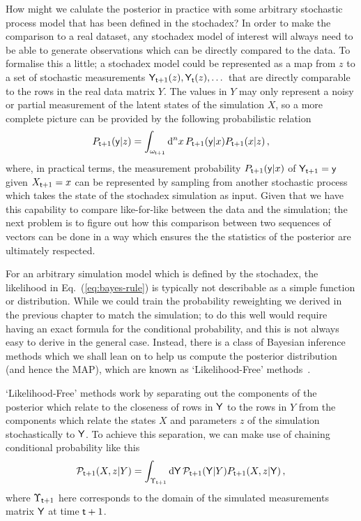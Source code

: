 How might we calulate the posterior in practice with some arbitrary stochastic process model that has been defined in the stochadex? In order to make the comparison to a real dataset, any stochadex model of interest will always need to be able to generate observations which can be directly compared to the data. To formalise this a little; a stochadex model could be represented as a map from $z$ to a set of stochastic measurements ${\sf Y}_{{\sf t}+1}(z), {\sf Y}_{{\sf t}}(z), \dots$ that are directly comparable to the rows in the real data matrix $Y$. The values in $Y$ may only represent a noisy or partial measurement of the latent states of the simulation $X$, so a more complete picture can be provided by the following probabilistic relation
\begin{align}
P_{{\sf t}+1}({\sf y} \vert z) = \int_{\omega_{{\sf t}+1}}{\rm d}^nx\, P_{{\sf t}+1}({\sf y} \vert x)P_{{\sf t}+1}(x \vert z) \,, \label{eq:simulation-measurement}
\end{align}
where, in practical terms, the measurement probability $P_{{\sf t}+1}({\sf y} \vert x)$ of ${\sf Y}_{{\sf t}+1}={\sf y}$ given $X_{{\sf t}+1}=x$ can be represented by sampling from another stochastic process which takes the state of the stochadex simulation as input. Given that we have this capability to compare like-for-like between the data and the simulation; the next problem is to figure out how this comparison between two sequences of vectors can be done in a way which ensures the the statistics of the posterior are ultimately respected. 

For an arbitrary simulation model which is defined by the stochadex, the likelihood in Eq.~(\ref{eq:bayes-rule}) is typically not describable as a simple function or distribution. While we could train the probability reweighting we derived in the previous chapter to match the simulation; to do this well would require having an exact formula for the conditional probability, and this is not always easy to derive in the general case. Instead, there is a class of Bayesian inference methods which we shall lean on to help us compute the posterior distribution (and hence the MAP), which are known as `Likelihood-Free' methods~\cite{sisson2018handbook,price2018bayesian,wood2010statistical,drovandi2022comparison}.

`Likelihood-Free' methods work by separating out the components of the posterior which relate to the closeness of rows in ${\sf Y}$ to the rows in $Y$ from the components which relate the states $X$ and parameters $z$ of the simulation stochastically to ${\sf Y}$. To achieve this separation, we can make use of chaining conditional probability like this
\begin{align}
{\cal P}_{{\sf t}+1}(X,z\vert Y)=\int_{\Upsilon_{{\sf t}+1}} {\rm d}{\sf Y} \, {\cal P}_{{\sf t}+1}({\sf Y}\vert Y) P_{{\sf t}+1}(X,z \vert {\sf Y}) \label{eq:likelihood-free-posterior} \,,
\end{align}
where $\Upsilon_{{\sf t}+1}$ here corresponds to the domain of the simulated measurements matrix ${\sf Y}$ at time ${\sf t}+1$.


